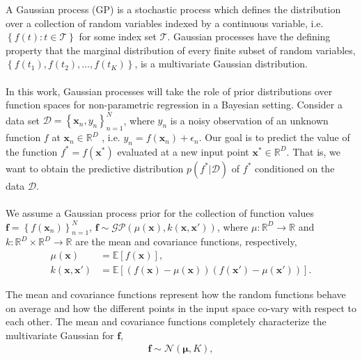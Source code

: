 \documentclass[]{interact}
\theoremstyle{plain}%
\theoremstyle{definition}
\theoremstyle{remark}
\begin{document}
A Gaussian process (GP) is a stochastic process which defines the distribution over a collection of random variables indexed by a continuous variable, i.e. $\left\lbrace f(t): t \in \mathcal{T}\right\rbrace$ for some index set $\mathcal{T}$. Gaussian processes have the defining property that the marginal distribution of every finite subset of random variables, $\left\lbrace f(t_1), f(t_2), \hdots, f(t_K) \right\rbrace$, is a multivariate Gaussian distribution.
\\
\\
In this work, Gaussian processes will take the role of prior distributions over function spaces for non-parametric regression in a Bayesian setting. 
Consider a data set $\mathcal{D} = \left\lbrace \mathbf{x}_n, y_n \right\rbrace_{n=1}^N$, where $y_n$ is a noisy observation of an unknown function $f$ at $\mathbf{x}_n \in \mathbb{R}^D$ , i.e. $y_n = f(\mathbf{x}_n) + \epsilon_n$. Our goal is to predict the value of the function $f^*=f(\mathbf{x}^*)$ evaluated at a new input point $\mathbf{x}^* \in \mathbb{R}^D$. That is, we want to obtain the predictive distribution $p(f^*|\mathcal{D})$ of $f^*$ conditioned on the data $\mathcal{D}$.
\\
\\
We assume a Gaussian process prior for the collection of function values $\mathbf{f}=\left\lbrace f(\mathbf{x}_n) \right\rbrace_{n=1}^N $, $\mathbf{f} \sim \mathcal{GP}(\mu(\mathbf{x}), k(\mathbf{x}, \mathbf{x}'))$, where $\mu: \mathbb{R}^D \rightarrow \mathbb{R}$ and $k: \mathbb{R}^D \times \mathbb{R}^D \rightarrow \mathbb{R}$ are the mean and covariance functions, respectively,
%
\begin{align*}
 	\mu(\mathbf{x}) &= \mathbb{E}\!\left[f(\mathbf{x})\right],\\ 
 	k(\mathbf{x}, \mathbf{x}') &= \mathbb{E}\!\left[\left( f(\mathbf{x}) - \mu(\mathbf{x}) \right)\left( f(\mathbf{x}') - \mu(\mathbf{x}') \right)\right].
\end{align*} 

The mean and covariance functions represent how the random functions behave on average and how the different points in the input space co-vary with respect to each other. The mean and covariance functions completely characterize the multivariate Gaussian for $\mathbf{f}$, 
\begin{align*}
\mathbf{f} \sim \mathcal{N}(\boldsymbol{\mu},K),
\end{align*}
\end{document}
